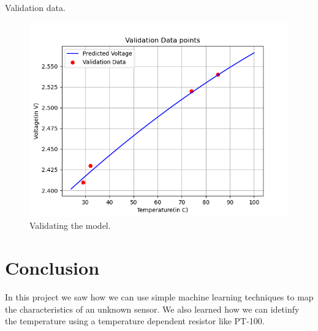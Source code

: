 \documentclass[journal,12pt,twocolumn]{IEEEtran}
\begin{document}
\begin{table}[!ht]
    \centering
    
    \caption{Validation data.}
    \label{tab:valid}
\end{table}

\begin{figure}[!ht]
    \centering
    \includegraphics[width=\columnwidth]{figs/Validation_Data.png}
    \caption{Validating the model.}
    \label{fig:valid}
\end{figure}

\section{Conclusion}
In this project we saw how we can use simple machine learning techniques to map the characteristics of an unknown sensor. We also learned how we can idetinfy the temperature using a temperature dependent resistor like PT-100.
\end{document}
